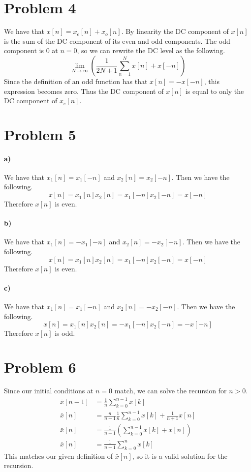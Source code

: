\documentclass[12pt]{article}
\begin{document}
\section*{Problem 4}

We have that \(x[n] = x_e[n] + x_o[n]\). By linearity the DC component of \(x[n]\) is the sum of the DC component of its even and odd components.
The odd component is \(0\) at \(n=0\), so we can rewrite the DC level as the following.
\[\lim_{N\to\infty} \left(\frac{1}{2N+1}\sum_{n=1}^N x[n] + x[-n]\right)\]
Since the definition of an odd function has that \(x[n] = -x[-n]\), this expression becomes zero. Thus the DC component of \(x[n]\) is equal
to only the DC component of \(x_e[n]\).

\section*{Problem 5}

\paragraph{a)}

We have that \(x_1[n] = x_1[-n]\) and \(x_2[n] = x_2[-n]\). Then we have the following.
\[x[n]=x_1[n]x_2[n]=x_1[-n]x_2[-n]=x[-n]\]
Therefore \(x[n]\) is even.

\paragraph{b)}

We have that \(x_1[n] = -x_1[-n]\) and \(x_2[n] = -x_2[-n]\). Then we have the following.
\[x[n]=x_1[n]x_2[n]=x_1[-n]x_2[-n]=x[-n]\]
Therefore \(x[n]\) is even.

\paragraph{c)}

We have that \(x_1[n] = x_1[-n]\) and \(x_2[n] = -x_2[-n]\). Then we have the following.
\[x[n]=x_1[n]x_2[n]=-x_1[-n]x_2[-n]=-x[-n]\]
Therefore \(x[n]\) is odd.

\section*{Problem 6}

Since our initial conditions at \(n=0\) match, we can solve the recursion for \(n>0\).
\begin{align*}
    \bar{x}[n-1] &= \frac{1}{n}\sum_{k=0}^{n-1}x[k]\\
    \bar{x}[n] &= \frac{n}{n+1}\frac{1}{n}\sum_{k=0}^{n-1}x[k] + \frac{1}{n+1}x[n]\\
    \bar{x}[n] &= \frac{1}{n+1}\left(\sum_{k=0}^{n-1}x[k] + x[n]\right)\\
    \bar{x}[n] &= \frac{1}{n+1}\sum_{k=0}^n x[k]
\end{align*}
This matches our given definition of \(\bar{x}[n]\), so it is a valid solution for the recursion.
\end{document}
